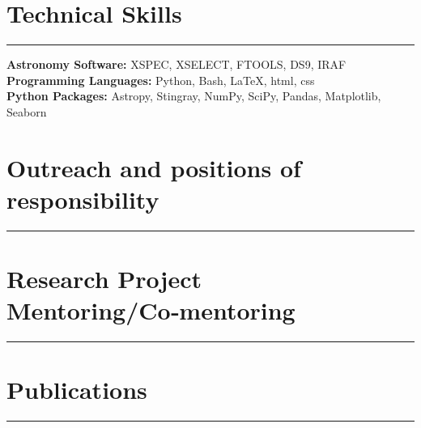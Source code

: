 \documentclass[12pt]{article}
\begin{document}
\vspace{0.7em}

\section*{Technical Skills}
\vspace{-0.5em}
\noindent\rule{\textwidth}{0.4pt}
\textbf{Astronomy Software:} XSPEC, XSELECT, FTOOLS, DS9, IRAF \\
\textbf{Programming Languages:} Python, Bash, \LaTeX, html, css \\
\textbf{Python Packages:} Astropy, Stingray, NumPy, SciPy, Pandas, Matplotlib, Seaborn \\

\vspace{0.7em}

\section*{Outreach and positions of responsibility}
\vspace{-0.5em}
\noindent\rule{\textwidth}{0.4pt}



\section*{Research Project Mentoring/Co‑mentoring}
\vspace{-0.5em}
\noindent\rule{\textwidth}{0.4pt}


\vspace{1em}


\section*{Publications}
\vspace{-0.5em}
\noindent\rule{\textwidth}{0.4pt}

\end{document}
